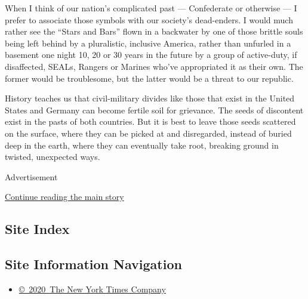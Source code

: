 When I think of our nation's complicated past --- Confederate or
otherwise --- I prefer to associate those symbols with our society's
dead-enders. I would much rather see the ``Stars and Bars'' flown in a
backwater by one of those brittle souls being left behind by a
pluralistic, inclusive America, rather than unfurled in a basement one
night 10, 20 or 30 years in the future by a group of active-duty, if
disaffected, SEALs, Rangers or Marines who've appropriated it as their
own. The former would be troublesome, but the latter would be a threat
to our republic.

History teaches us that civil-military divides like those that exist in
the United States and Germany can become fertile soil for grievance. The
seeds of discontent exist in the pasts of both countries. But it is best
to leave those seeds scattered on the surface, where they can be picked
at and disregarded, instead of buried deep in the earth, where they can
eventually take root, breaking ground in twisted, unexpected ways.

Advertisement

\protect\hyperlink{after-bottom}{Continue reading the main story}

\hypertarget{site-index}{%
\subsection{Site Index}\label{site-index}}

\hypertarget{site-information-navigation}{%
\subsection{Site Information
Navigation}\label{site-information-navigation}}

\begin{itemize}
\tightlist
\item
  \href{https://help.nytimes.com/hc/en-us/articles/115014792127-Copyright-notice}{©~2020~The
  New York Times Company}
\end{itemize}

